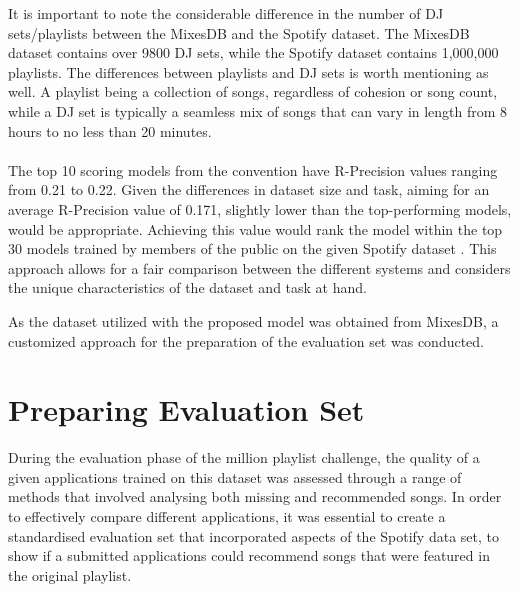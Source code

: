 It is important to note the considerable difference in the number of DJ sets/playlists between the MixesDB and the Spotify dataset. The MixesDB dataset contains over 9800 DJ sets, while the Spotify dataset contains 1,000,000 playlists. The differences between playlists and DJ sets is worth mentioning as well. A playlist being a collection of songs, regardless of cohesion or song count, while a DJ set is typically a seamless mix of songs that can vary in length from 8 hours to no less than 20 minutes.
\\
\\
The top 10 scoring models from the convention have R-Precision values ranging from 0.21 to 0.22. Given the differences in dataset size and task, aiming for an average R-Precision value of 0.171, slightly lower than the top-performing models, would be appropriate. Achieving this value would rank the model within the top 30 models trained by members of the public on the given Spotify dataset \citep{aicrowd_aicrowd_2023}. This approach allows for a fair comparison between the different systems and considers the unique characteristics of the dataset and task at hand. 

As the dataset utilized with the proposed model was obtained from MixesDB, a customized approach for the preparation of the evaluation set was conducted.

\section{Preparing Evaluation Set}
During the evaluation phase of the million playlist challenge, the quality of a given applications trained on this dataset was assessed through a range of methods that involved analysing both missing and recommended songs. In order to effectively compare different applications, it was essential to create a standardised evaluation set that incorporated aspects of the Spotify data set, to show if a submitted applications could recommend songs that were featured in the original playlist.

